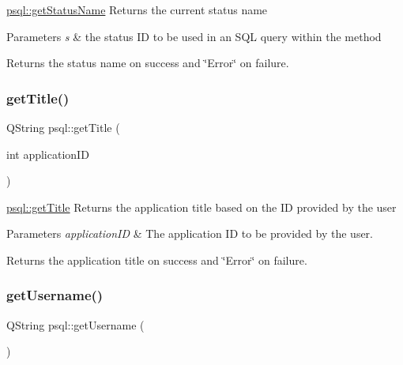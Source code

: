 \mbox{\hyperlink{classpsql_a5c2a64419a68a258071fd1f9a37c7c09}{psql\+::get\+Status\+Name}} Returns the current status name 


\begin{DoxyParams}{Parameters}
{\em s} & the status ID to be used in an S\+QL query within the method \\
\hline
\end{DoxyParams}
\begin{DoxyReturn}{Returns}
the status name on success and \char`\"{}\+Error\char`\"{} on failure. 
\end{DoxyReturn}
\mbox{\label{classpsql_ada9e3be3e0866011edf53e30ec510afc}} 
\subsubsection{\texorpdfstring{get\+Title()}{getTitle()}}
{\footnotesize\ttfamily Q\+String psql\+::get\+Title (\begin{DoxyParamCaption}\item[{int}]{application\+ID }\end{DoxyParamCaption})}



\mbox{\hyperlink{classpsql_ada9e3be3e0866011edf53e30ec510afc}{psql\+::get\+Title}} Returns the application title based on the ID provided by the user 


\begin{DoxyParams}{Parameters}
{\em application\+ID} & The application ID to be provided by the user. \\
\hline
\end{DoxyParams}
\begin{DoxyReturn}{Returns}
the application title on success and \char`\"{}\+Error\char`\"{} on failure. 
\end{DoxyReturn}
\mbox{\label{classpsql_aecc9fd93dc5ca0c4f4a63d445a36d166}} 
\subsubsection{\texorpdfstring{get\+Username()}{getUsername()}}
{\footnotesize\ttfamily Q\+String psql\+::get\+Username (\begin{DoxyParamCaption}{ }\end{DoxyParamCaption})}



